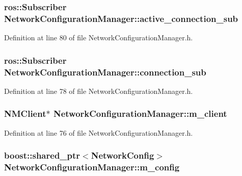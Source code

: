 \subsubsection[{active\-\_\-connection\-\_\-sub}]{\setlength{\rightskip}{0pt plus 5cm}ros\-::\-Subscriber {\bf \-Network\-Configuration\-Manager\-::active\-\_\-connection\-\_\-sub}\hspace{0.3cm}{\ttfamily  [private]}}\label{classNetworkConfigurationManager_a87f5f5864731d45b3ad342445f1e081c}


\-Definition at line 80 of file \-Network\-Configuration\-Manager.\-h.

\subsubsection[{connection\-\_\-sub}]{\setlength{\rightskip}{0pt plus 5cm}ros\-::\-Subscriber {\bf \-Network\-Configuration\-Manager\-::connection\-\_\-sub}\hspace{0.3cm}{\ttfamily  [private]}}\label{classNetworkConfigurationManager_a6ce6469d5de5bc935062c3902bf57ae0}


\-Definition at line 78 of file \-Network\-Configuration\-Manager.\-h.

\subsubsection[{m\-\_\-client}]{\setlength{\rightskip}{0pt plus 5cm}\-N\-M\-Client$\ast$ {\bf \-Network\-Configuration\-Manager\-::m\-\_\-client}\hspace{0.3cm}{\ttfamily  [private]}}\label{classNetworkConfigurationManager_ad3e7ab11c29f836976fa4432c069fadc}


\-Definition at line 76 of file \-Network\-Configuration\-Manager.\-h.

\subsubsection[{m\-\_\-config}]{\setlength{\rightskip}{0pt plus 5cm}boost\-::shared\-\_\-ptr$<${\bf \-Network\-Config}$>$ {\bf \-Network\-Configuration\-Manager\-::m\-\_\-config}\hspace{0.3cm}{\ttfamily  [private]}}\label{classNetworkConfigurationManager_a13e746bf1caed53802c1abc6d84039cc}


